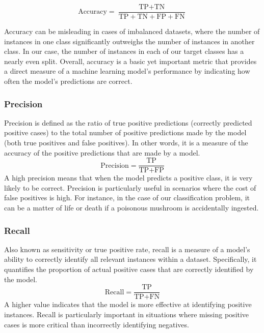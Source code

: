 \documentclass[11pt, conference]{IEEEtran}
\begin{document}
    \begin{equation}
        \text{Accuracy} = \frac{\text{TP} + \text{TN}}{\text{TP} + \text{TN} + \text{FP} + \text{FN}}\label{eq1}
    \end{equation}
    
    Accuracy can be misleading in cases of imbalanced datasets, where the number of instances in one class significantly outweighs the number of instances in another class. In our case, the number of instances in each of our target classes has a nearly even split. Overall, accuracy is a basic yet important metric that provides a direct measure of a machine learning model's performance by indicating how often the model's predictions are correct. 

    \subsubsection{Precision}
    Precision is defined as the ratio of true positive predictions (correctly predicted positive cases) to the total number of positive predictions made by the model (both true positives and false positives). In other words, it is a measure of the accuracy of the positive predictions that are made by a model. 
    \begin{equation}
        \text{Precision} = \frac{\text{TP}}{\text{TP} + \text{FP}}\label{eq2}
    \end{equation}
    A high precision means that when the model predicts a positive class, it is very likely to be correct. Precision is particularly useful in scenarios where the cost of false positives is high. For instance, in the case of our classification problem, it can be a matter of life or death if a poisonous mushroom is accidentally ingested.
    
    \subsubsection{Recall}
    Also known as sensitivity or true positive rate, recall is a measure of a model's ability to correctly identify all relevant instances within a dataset. Specifically, it quantifies the proportion of actual positive cases that are correctly identified by the model.
    \begin{equation}
        \text{Recall} = \frac{\text{TP}}{\text{TP} + \text{FN}}\label{eq3}
    \end{equation}
    A higher value indicates that the model is more effective at identifying positive instances. Recall is particularly important in situations where missing positive cases is more critical than incorrectly identifying negatives.
    
\end{document}
